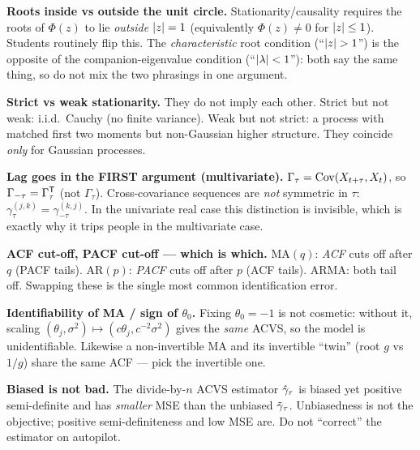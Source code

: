\begin{pitfall}
\textbf{Roots inside vs outside the unit circle.} Stationarity/causality
requires the roots of $\Phi(z)$ to lie \emph{outside} $\left\lvert z \right\rvert=1$ (equivalently
$\Phi(z)\ne0$ for $\left\lvert z \right\rvert\le1$). Students routinely flip this. The
\emph{characteristic} root condition (``$\left\lvert z \right\rvert>1$'') is the opposite of the
companion-eigenvalue condition (``$\left\lvert \lambda \right\rvert<1$''): both say the same thing,
so do not mix the two phrasings in one argument.
\end{pitfall}

\begin{pitfall}
\textbf{Strict vs weak stationarity.} They do not imply each other. Strict but
not weak: i.i.d.\ Cauchy (no finite variance). Weak but not strict: a process
with matched first two moments but non-Gaussian higher structure. They coincide
\emph{only} for Gaussian processes.
\end{pitfall}

\begin{pitfall}
\textbf{Lag goes in the FIRST argument (multivariate).}
$\Gamma_\tau=\operatorname{Cov}(X_{t+\tau},X_t)$, so $\Gamma_{-\tau}=\Gamma_\tau^{\mathsf{T}}$ (not
$\Gamma_\tau$). Cross-covariance sequences are \emph{not} symmetric in $\tau$:
$\gamma^{(j,k)}_\tau=\gamma^{(k,j)}_{-\tau}$. In the univariate real case this
distinction is invisible, which is exactly why it trips people in the
multivariate case.
\end{pitfall}

\begin{pitfall}
\textbf{ACF cut-off, PACF cut-off --- which is which.} MA$(q)$: \emph{ACF} cuts
off after $q$ (PACF tails). AR$(p)$: \emph{PACF} cuts off after $p$ (ACF tails).
ARMA: both tail off. Swapping these is the single most common identification
error.
\end{pitfall}

\begin{pitfall}
\textbf{Identifiability of MA / sign of $\theta_0$.} Fixing $\theta_0=-1$ is not
cosmetic: without it, scaling
$(\theta_j,\sigma^2)\mapsto(c\theta_j,c^{-2}\sigma^2)$ gives the \emph{same}
ACVS, so the model is unidentifiable. Likewise a non-invertible MA and its
invertible ``twin'' (root $g$ vs $1/g$) share the same ACF --- pick the
invertible one.
\end{pitfall}

\begin{pitfall}
\textbf{Biased is not bad.} The divide-by-$n$ ACVS estimator $\hat{\gamma}_\tau$ is
biased yet positive semi-definite and has \emph{smaller} MSE than the unbiased
$\tilde{\gamma}_\tau$. Unbiasedness is not the objective; positive
semi-definiteness and low MSE are. Do not ``correct'' the estimator on autopilot.
\end{pitfall}

